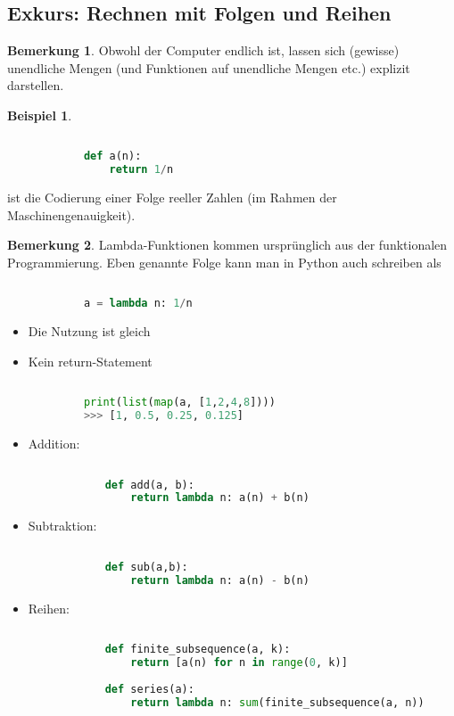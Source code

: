 \documentclass[a4paper,12pt]{article}
\theoremstyle{definition}
\newtheorem*{example}{Beispiel}
\newtheorem*{bemerkung}{Bemerkung}
\begin{document}
	\subsection{Exkurs: Rechnen mit Folgen und Reihen}
	\begin{bemerkung}
		Obwohl der Computer endlich ist, lassen sich (gewisse) unendliche Mengen (und Funktionen auf unendliche Mengen etc.) explizit darstellen.
	\end{bemerkung}	
	\begin{example}~
		\begin{lstlisting}[language=Python]
			
			def a(n):
				return 1/n
		\end{lstlisting}
		ist die Codierung einer Folge reeller Zahlen (im Rahmen der Maschinengenauigkeit).
	\end{example}
	\begin{bemerkung}
		Lambda-Funktionen kommen ursprünglich aus der funktionalen Programmierung. Eben genannte Folge kann man in Python auch schreiben als
		\begin{lstlisting}[language=Python]
			
			a = lambda n: 1/n
		\end{lstlisting}
		\begin{itemize}
			\item Die Nutzung ist gleich
			\item Kein return-Statement
		\end{itemize}
		\begin{lstlisting}[language=Python]
			
			print(list(map(a, [1,2,4,8])))
			>>> [1, 0.5, 0.25, 0.125]
		\end{lstlisting}
	\end{bemerkung}
	\begin{itemize}[label=]
		\item Addition:
		\begin{lstlisting}[language=Python]
			
			def add(a, b):
				return lambda n: a(n) + b(n)
		\end{lstlisting}
		
		\item Subtraktion:
		\begin{lstlisting}[language=Python]
			
			def sub(a,b):
				return lambda n: a(n) - b(n)
		\end{lstlisting}
		
		\item Reihen:
		\begin{lstlisting}[language=Python]
			
			def finite_subsequence(a, k):
				return [a(n) for n in range(0, k)]
			
			def series(a):
				return lambda n: sum(finite_subsequence(a, n))
		\end{lstlisting}
	\end{itemize}
\end{document}
